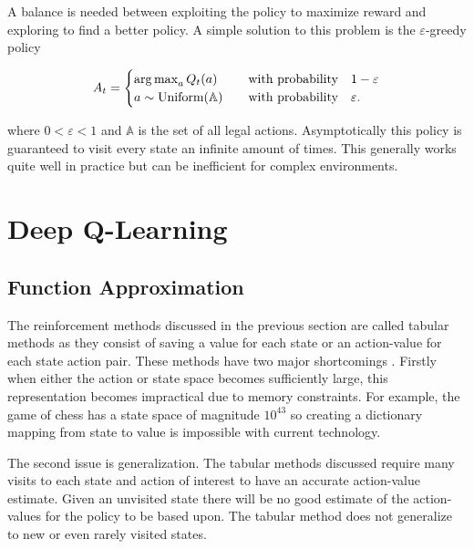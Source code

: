 A balance is needed between exploiting the policy to maximize reward and exploring to find a better policy. A simple solution to this problem is the $\varepsilon$-greedy policy 

\begin{equation}
    A_t = \begin{cases}
        \operatorname*{arg\,max}_a Q_t(a) &\quad \text{with probability} \quad 1-\varepsilon \\
        a \sim \text{Uniform} (\mathbb{A})  &\quad \text{with probability} \quad \varepsilon.
    \end{cases}
\end{equation}

where $0 < \varepsilon < 1$ and $\mathbb{A}$ is the set of all legal actions.
Asymptotically this policy is guaranteed to visit every state an infinite amount of times. This generally works quite well in practice but can be inefficient for complex environments. \citep[p.~27-28]{sutton_barto_2018}

\section{Deep Q-Learning}

\subsection{Function Approximation}

The reinforcement methods discussed in the previous section are called tabular methods as they consist of saving a value for each state or an action-value for each state action pair. These methods have two major shortcomings \cite[p.~195-196]{sutton_barto_2018}. Firstly when either the action or state space becomes sufficiently large, this representation becomes impractical due to memory constraints. For example, the game of chess has a state space of magnitude $10^{43}$\citep{shannon_1950} so creating a dictionary mapping from state to value is impossible with current technology. 

The second issue is generalization. The tabular methods discussed require many visits to each state and action of interest to have an accurate action-value estimate. Given an unvisited state there will be no good estimate of the action-values for the policy to be based upon. The tabular method does not generalize to new or even rarely visited states.

